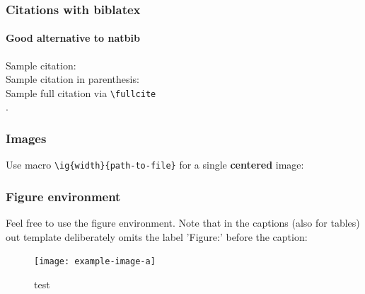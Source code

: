 \documentclass[t,english]{beamer}
\begin{document}
\begin{frame}[fragile]
  \frametitle{Citations with biblatex}
  \framesubtitle{Good alternative to natbib}

  Sample citation:~\cite{BNPS2019}\\
  Sample citation in parenthesis:~\parencite{BNPS2019}\\
  Sample full citation via \verb|\fullcite|\\[0.5cm]
  .\\[0.5cm]

\end{frame}

\begin{frame}[fragile]
  \frametitle{Images}

  Use macro \verb|\ig{width}{path-to-file}| for a single \textbf{centered} image:
\end{frame}


\begin{frame}
  \frametitle{Figure environment}

  Feel free to use the figure environment. Note that in the captions (also for tables) out template deliberately omits the label 'Figure:' before the caption:

  \begin{figure}[H]
    \texttt{[image: example-image-a]}
    \caption{test}
  \end{figure}

\end{frame}
\end{document}
